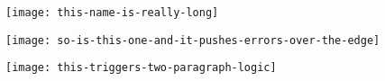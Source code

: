 \documentclass{article}
\begin{document}
\texttt{[image: this-name-is-really-long]}

\texttt{[image: so-is-this-one-and-it-pushes-errors-over-the-edge]}

\texttt{[image: this-triggers-two-paragraph-logic]}
\end{document}
